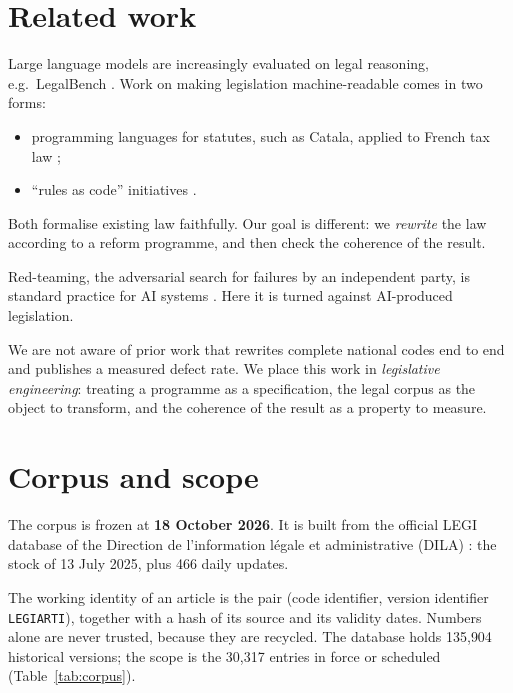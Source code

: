\documentclass[11pt,a4paper]{article}
\begin{document}
\section{Related work}

Large language models are increasingly evaluated on legal reasoning, e.g.\ LegalBench \cite{legalbench}. Work on making legislation machine-readable comes in two forms:
\begin{itemize}
  \item programming languages for statutes, such as Catala, applied to French tax law \cite{catala};
  \item ``rules as code'' initiatives \cite{oecd2020}.
\end{itemize}
Both formalise existing law faithfully. Our goal is different: we \emph{rewrite} the law according to a reform programme, and then check the coherence of the result.

Red-teaming, the adversarial search for failures by an independent party, is standard practice for AI systems \cite{ganguli2022}. Here it is turned against AI-produced legislation.

We are not aware of prior work that rewrites complete national codes end to end and publishes a measured defect rate. We place this work in \emph{legislative engineering}: treating a programme as a specification, the legal corpus as the object to transform, and the coherence of the result as a property to measure.

\section{Corpus and scope}
\label{sec:corpus}

The corpus is frozen at \textbf{18 October 2026}. It is built from the official LEGI database of the Direction de l'information légale et administrative (DILA) \cite{legi}: the stock of 13 July 2025, plus 466 daily updates.

The working identity of an article is the pair (code identifier, version identifier \texttt{LEGIARTI}), together with a hash of its source and its validity dates. Numbers alone are never trusted, because they are recycled. The database holds 135{,}904 historical versions; the scope is the 30{,}317 entries in force or scheduled (Table~\ref{tab:corpus}).
\end{document}
